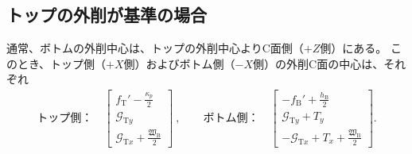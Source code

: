 \subsection{トップの外削が基準の場合}
通常、ボトムの外削中心は、トップの外削中心よりC面側（$+Z$側）にある。
このとき、トップ側（$+X$側）およびボトム側（$-X$側）の外削C面の中心は、それぞれ
\begin{align*}
  \text{トップ側：}\quad
  \left[
    \begin{array}{c}
      \displaystyle f_\mathrm T'-\frac{\kappa_p}2\\[5pt]
      \mathcal G_{\mathrm Ty}\\[3pt]
      \displaystyle \mathcal G_{\mathrm Tx}+\frac{\mathfrak W_\mathrm B}2
    \end{array}
    \right]~, \qquad
  \text{ボトム側：}\quad
  \left[
    \begin{array}{c}
      \displaystyle -f_\mathrm B'+\frac{h_\mathrm B}2\\[5pt]
      \mathcal G_{\mathrm Ty}+T_y\\[3pt]
      \displaystyle -\mathcal G_{\mathrm Tx}+T_x+\frac{\mathfrak W_\mathrm B}2
    \end{array}
  \right].
\end{align*}




\clearpage
